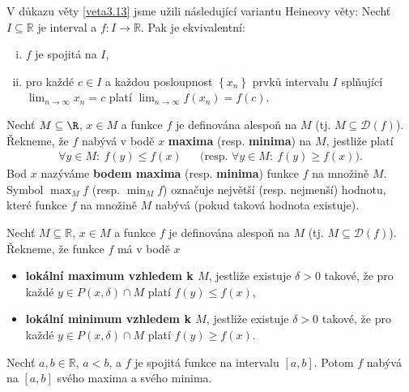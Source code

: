 \begin{poznamka}
	V důkazu věty \ref{veta3.13} jsme užili následující variantu Heineovy věty:
	Nechť $I\subseteq \mathbb R $ je interval a $f:I\to \mathbb R $. Pak je ekvivalentní:
	\begin{enumerate}[(i)]
		\item $f$ je spojitá na $I$,
		\item pro každé $c\in I$ a každou posloupnost $\left \{ x_n \right \} $ prvků intervalu $I$
		splňující $\lim_{n \to \infty} x_n=c$ platí $\lim_{n \to \infty} f(x_n)=f(c)$.
\end{enumerate}
\end{poznamka}

\begin{definice}
Nechť $M\subseteq\R$, $x\in M$ a funkce $f$ je definována alespoň na $M$ (tj. $M\subseteq\mathcal D(f)$).
Řekneme, že $f$ nabývá v bodě $x$ \textbf{maxima} (resp. \textbf{minima}) na $M$, jestliže platí
\begin{align*}
	\forall y\in M:\ f(y)\le f(x) && \textrm{(resp. }\forall y\in M:\ f(y)\ge f(x)\textrm{)}.
\end{align*}
Bod $x$ nazýváme \textbf{bodem maxima}
(resp. \textbf{minima}) funkce $f$ na množině $M$. Symbol $\max_M f$ (resp. $\min_M f$) označuje největší (resp. nejmenší) hodnotu,
které funkce $f$ na množině $M$ nabývá (pokud taková hodnota existuje).
\end{definice}

\begin{definice}
Nechť $M\subseteq \mathbb R $, $x\in M$ a funkce $f$ je definována alespoň na $M$ (tj. $M\subseteq \mathcal D(f)$).
Řekneme, že funkce $f$ má v bodě $x$
\begin{itemize}
	\item \textbf{lokální maximum vzhledem k $M$}, jestliže existuje $\delta>0$ takové,
	že pro každé $y\in P(x,\delta)\cap M$ platí $f(y)\le f(x)$,
	\item \textbf{lokální minimum vzhledem k $M$}, jestliže existuje $\delta>0$ takové,
	že pro každé $y\in P(x,\delta)\cap M$ platí $f(y)\geq f(x)$.
\end{itemize}
\end{definice}

\begin{veta}\label{veta3.14} %
Nechť $a,b\in \mathbb R $, $a<b$, a $f$ je spojitá funkce na intervalu $[a,b]$. Potom $f$ nabývá na $[a,b]$ svého maxima a svého minima.
\end{veta}

